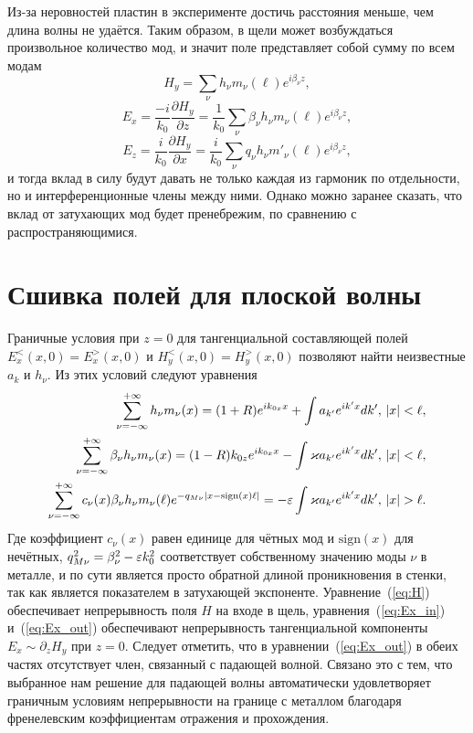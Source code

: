 Из-за неровностей пластин в эксперименте достичь расстояния меньше, чем длина волны не удаётся. Таким образом, в щели может возбуждаться произвольное количество мод, и значит поле представляет собой сумму по всем модам 
\begin{equation*}
H_y = \sum_{\nu} h_\nu m_\nu(\ell) e^{i \beta_\nu z},
\end{equation*}
\begin{equation*}
E_x = \frac{-i}{k_0}\frac{\partial H_y}{\partial z} = \frac{1}{k_0}\sum_{\nu}\beta_\nu h_\nu m_\nu(\ell) e^{i \beta_\nu z},
\end{equation*}
\begin{equation*}
E_z = \frac{i}{k_0}\frac{\partial H_y}{\partial x} = \frac{i}{k_0}\sum_{\nu} q_\nu h_\nu  m'_\nu(\ell) e^{i \beta_\nu z},
\end{equation*}
и тогда вклад в силу будут давать не только каждая из гармоник по отдельности, но и интерференционные члены между ними. Однако можно заранее сказать, что вклад от затухающих мод будет пренебрежим, по сравнению с распространяющимися. 

\section{Сшивка полей для плоской волны}

 Граничные условия при $z = 0$ для тангенциальной составляющей полей $E_x^<(x,0) = E_x^>(x,0) $ и $H_y^<(x,0) = H_y^>(x,0)$ 
 позволяют найти неизвестные $a_k$ и $h_\nu$.  Из этих условий следуют уравнения 
\begin{align}
\sum_{\nu = -\infty}^{+\infty} h_\nu m_\nu (x) = (1+R)e^{ik_{0x}x} 
+ \int a_{k'} e^{ik'x} dk', & \ \abs{x}<\ell, \label{eq:H} \\
\sum_{\nu = -\infty}^{+\infty} \beta_\nu h_\nu m_\nu(x) = (1-R)k_{0z}e^{ik_{0x}x}
- \int \varkappa a_{k'} e^{ik'x} dk', &\ \abs{x}<\ell,  \label{eq:Ex_in} \\
  \sum_{\nu = -\infty}^{+\infty} c_\nu(x)\beta_\nu h_\nu m_\nu(\ell) e^{-q_{M\nu}\abs{x-\text{sign}(x)\ell}} = 
 -\eps \int \varkappa a_{k'} e^{ik'x} dk', &\ \abs{x}>\ell. \label{eq:Ex_out}
\end{align}
Где коэффициент $c_\nu(x)$ равен единице для чётных мод и $\text{sign}(x)$ для нечётных, $q_{M\nu}^2 = \beta_\nu^2 - \varepsilon k_0^2$
соответствует собственному значению моды $\nu$ в металле, и по сути является просто обратной длиной проникновения в стенки, так как 
является показателем в затухающей экспоненте. Уравнение~(\ref{eq:H}) обеспечивает непрерывность поля $H$ на входе в щель, 
уравнения~(\ref{eq:Ex_in}) и~(\ref{eq:Ex_out}) обеспечивают непрерывность тангенциальной компоненты $E_x \sim \partial_{z} H_y$ при $z = 0$. Следует отметить, что в уравнении~(\ref{eq:Ex_out}) в обеих частях отсутствует член, связанный с падающей волной. Связано это с тем, что выбранное нам решение для падающей волны автоматически удовлетворяет граничным условиям непрерывности на границе с металлом благодаря френелевским коэффициентам отражения и прохождения.  

